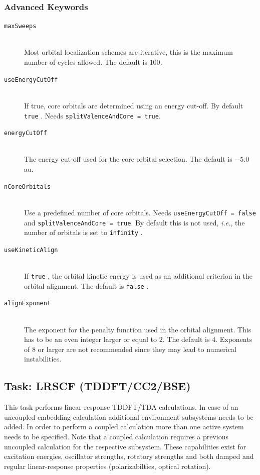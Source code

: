 \documentclass[bibliography=totocnumbered,a4paper,10pt,oneside]{scrbook}
\newcommand{\ttt}[1]{%
  \begingroup\setlength{\fboxsep}{1pt}%
  \colorbox{serenity-green!30}{\texttt{\hspace*{2pt}\vphantom{(g}#1\hspace*{2pt}}}%
  \endgroup
}
\begin{document}
\subsubsection{Advanced Keywords}
\begin{description}
 \item [\texttt{maxSweeps}]\hfill \\
   Most orbital localization schemes are iterative, this is the maximum number of cycles allowed.
   The default is $100$.
 \item [\texttt{useEnergyCutOff}]\hfill \\
   If true, core orbitals are determined using an energy cut-off. By default \ttt{true}.
   Needs \texttt{splitValenceAndCore = true}.
 \item [\texttt{energyCutOff}]\hfill \\
    The energy cut-off used for the core orbital selection. The default is $-5.0$ au.
 \item [\texttt{nCoreOrbitals}]\hfill \\
    Use a predefined number of core orbitals. Needs \texttt{useEnergyCutOff = false} and \texttt{splitValenceAndCore = true}.
    By default this is not used, \emph{i.e.}, the number of orbitals is set to \ttt{infinity}.
 \item [\texttt{useKineticAlign}]\hfill \\
   If \ttt{true}, the orbital kinetic energy is used as an additional criterion in the orbital alignment.
   The default is \ttt{false}.
 \item [\texttt{alignExponent}]\hfill \\
   The exponent for the penalty function used in the orbital alignment. This has to be an even integer
   larger or equal to $2$. The default is $4$. Exponents of $8$ or larger are not recommended since they
   may lead to numerical instabilities.
\end{description}

\clearpage
\subsection{Task: LRSCF (TDDFT/CC2/BSE)}
This task performs linear-response TDDFT/TDA calculations. In case of an uncoupled embedding calculation additional environment subsystems needs to be added. In order to perform a coupled calculation more than one active system needs to be specified. Note that a coupled calculation requires a previous uncoupled calculation for the respective subsystem. These capabilities exist for excitation energies, oscillator strengths, rotatory strengths and both damped and regular linear-response properties (polarizabilties, optical rotation).\\
\end{document}
